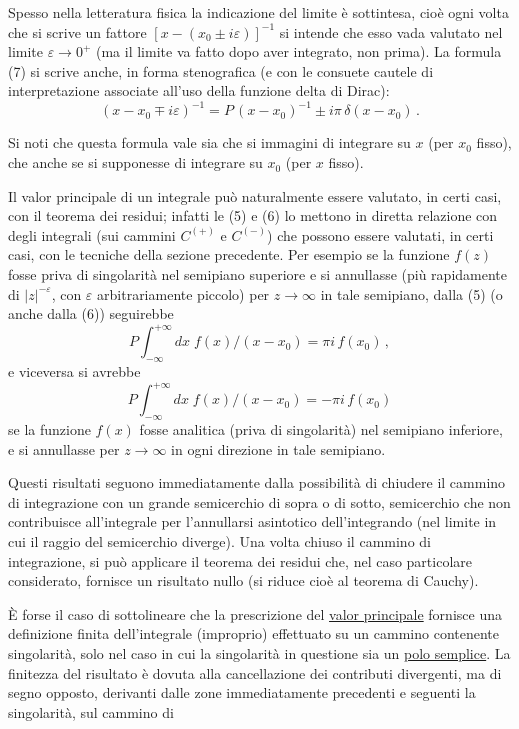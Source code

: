 \documentclass[11pt, a4paper]{book}
\numberwithin{equation}{section}
\begin{document}
Spesso nella letteratura fisica la indicazione del limite è sottintesa, cioè ogni volta che si scrive un fattore $\left[x-(x_0 \pm i\varepsilon)\right]^{-1}$ si intende che esso vada valutato nel limite $\varepsilon \to 0^+$ (ma il limite va fatto dopo aver%
integrato, non prima). La formula (7) si scrive anche, in forma stenografica (e con le consuete cautele di interpretazione associate all'uso della funzione delta di Dirac):
\begin{equation}
(x - x_0 \mp i\varepsilon)^{-1} = P\,(x-x_0)^{-1} \pm i\pi\,\delta(x-x_0)\,. \tag{8}
\end{equation}

Si noti che questa formula vale sia che si immagini di integrare su $x$ (per $x_0$ fisso), che anche se si supponesse di integrare su $x_0$ (per $x$ fisso).

Il valor principale di un integrale può naturalmente essere valutato, in certi casi, con il teorema dei residui; infatti le (5) e (6) lo mettono in diretta relazione con degli integrali (sui cammini $C^{(+)}$ e $C^{(-)}$) che possono essere valutati, in certi casi, con le tecniche della sezione precedente. Per esempio se la funzione $f(z)$ fosse priva di singolarità nel semipiano superiore e si annullasse (più rapidamente di $|z|^{-\varepsilon}$, con $\varepsilon$ arbitrariamente piccolo) per $z \to \infty$ in tale semipiano, dalla (5) (o anche dalla (6)) seguirebbe
\begin{equation}
P\!\int_{-\infty}^{+\infty} dx\; f(x)/(x-x_0) = \pi i\, f(x_0)\,, \tag{9}
\end{equation}
e viceversa si avrebbe
\begin{equation}
P\!\int_{-\infty}^{+\infty} dx\; f(x)/(x-x_0) = -\pi i\, f(x_0) \tag{10}
\end{equation}
se la funzione $f(x)$ fosse analitica (priva di singolarità) nel semipiano inferiore, e si annullasse per $z \to \infty$ in ogni direzione in tale semipiano.

Questi risultati seguono immediatamente dalla possibilità di chiudere il cammino di integrazione con un grande semicerchio di sopra o di sotto, semicerchio che non contribuisce all'integrale per l'annullarsi asintotico dell'integrando (nel limite in cui il raggio del semicerchio diverge). Una volta chiuso il cammino di integrazione, si può applicare il teorema dei residui che, nel caso particolare considerato, fornisce un risultato nullo (si riduce cioè al teorema di Cauchy).

È forse il caso di sottolineare che la prescrizione del \uline{valor principale} fornisce una definizione finita dell'integrale (improprio) effettuato su un cammino contenente singolarità, solo nel caso in cui la singolarità in questione sia un \uline{polo semplice}. La finitezza del risultato è dovuta alla cancellazione dei contributi divergenti, ma di segno opposto, derivanti dalle zone immediatamente precedenti e seguenti la singolarità, sul cammino di%
\end{document}
